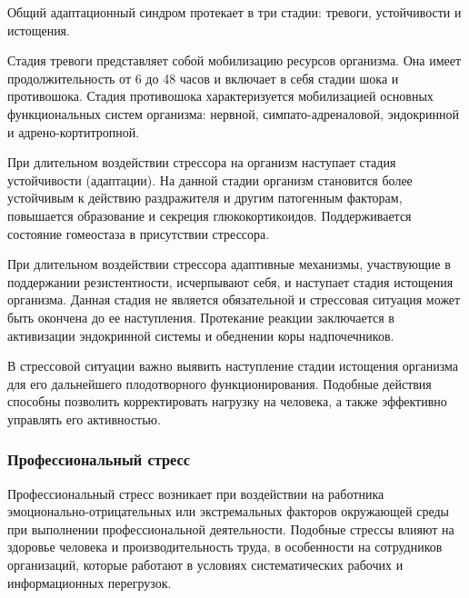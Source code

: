 Общий адаптационный синдром протекает в три стадии: тревоги, устойчивости и истощения.

Стадия тревоги представляет собой мобилизацию ресурсов организма. Она имеет продолжительность от 6 до 48 часов и включает в себя стадии шока и противошока. Стадия противошока характеризуется мобилизацией основных функциональных систем организма: нервной, симпато-адреналовой, эндокринной и адрено-кортитропной. \cite{stressAndPatology}

При длительном воздействии стрессора на организм наступает стадия устойчивости (адаптации). На данной стадии организм становится более устойчивым к действию раздражителя и другим патогенным факторам, повышается образование и секреция глюкокортикоидов. Поддерживается состояние гомеостаза в присутствии стрессора. \cite{stressAndPatology}

При длительном воздействии стрессора адаптивные механизмы, участвующие в поддержании резистентности, исчерпывают себя, и наступает стадия истощения организма. Данная стадия не является обязательной и стрессовая ситуация может быть окончена до ее наступления. Протекание реакции заключается в активизации эндокринной системы и обеднении коры надпочечников. \cite{stressAndPatology}

В стрессовой ситуации важно выявить наступление стадии истощения организма для его дальнейшего плодотворного функционирования. Подобные действия способны позволить корректировать нагрузку на человека, а также эффективно управлять его активностью.

\subsubsection{Профессиональный стресс}
Профессиональный стресс возникает при воздействии на работника эмоционально-отрицательных или экстремальных факторов окружающей среды при выполнении профессиональной деятельности. Подобные стрессы влияют на здоровье человека и производительность труда, в особенности на сотрудников организаций, которые работают в условиях систематических рабочих и информационных перегрузок. \cite{professionalStress}

